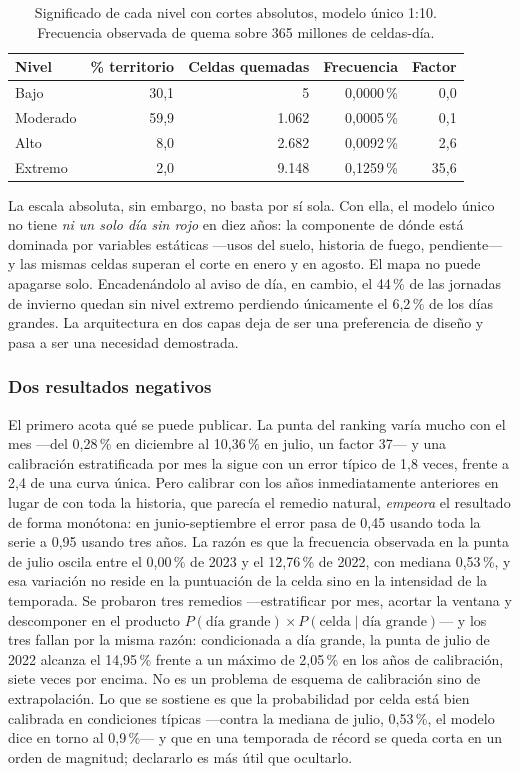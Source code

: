 \documentclass[10pt,a4paper]{article}
\begin{document}
\begin{table}[htbp]\centering\footnotesize
\caption{Significado de cada nivel con cortes absolutos, modelo único 1:10.
Frecuencia observada de quema sobre 365 millones de celdas-día.}
\label{tab:bandas}
\begin{tabular}{lrrrr}
\toprule
Nivel & \% territorio & Celdas quemadas & Frecuencia & Factor \\
\midrule
Bajo     & 30,1 & 5      & 0,0000\,\% & 0,0 \\
Moderado & 59,9 & 1.062  & 0,0005\,\% & 0,1 \\
Alto     & 8,0  & 2.682  & 0,0092\,\% & 2,6 \\
Extremo  & 2,0  & 9.148  & 0,1259\,\% & 35,6 \\
\bottomrule
\end{tabular}
\end{table}

La escala absoluta, sin embargo, no basta por sí sola. Con ella, el modelo único
no tiene \emph{ni un solo día sin rojo} en diez años: la componente de dónde está
dominada por variables estáticas ---usos del suelo, historia de fuego,
pendiente--- y las mismas celdas superan el corte en enero y en agosto. El mapa
no puede apagarse solo. Encadenándolo al aviso de día, en cambio, el 44\,\% de
las jornadas de invierno quedan sin nivel extremo perdiendo únicamente el
6,2\,\% de los días grandes. La arquitectura en dos capas deja de ser una
preferencia de diseño y pasa a ser una necesidad demostrada.

\subsubsection*{Dos resultados negativos}

El primero acota qué se puede publicar. La punta del ranking varía mucho con el
mes ---del 0,28\,\% en diciembre al 10,36\,\% en julio, un factor 37--- y una
calibración estratificada por mes la sigue con un error típico de 1,8 veces,
frente a 2,4 de una curva única. Pero calibrar con los años inmediatamente
anteriores en lugar de con toda la historia, que parecía el remedio natural,
\emph{empeora} el resultado de forma monótona: en junio-septiembre el error pasa
de 0,45 usando toda la serie a 0,95 usando tres años. La razón es que la
frecuencia observada en la punta de julio oscila entre el 0,00\,\% de 2023 y el
12,76\,\% de 2022, con mediana 0,53\,\%, y esa variación no reside en la
puntuación de la celda sino en la intensidad de la temporada. Se probaron tres remedios ---estratificar por
mes, acortar la ventana y descomponer en el producto
$P(\text{día grande})\times P(\text{celda}\mid\text{día grande})$--- y los tres
fallan por la misma razón: condicionada a día grande, la punta de julio de 2022
alcanza el 14,95\,\% frente a un máximo de 2,05\,\% en los años de calibración,
siete veces por encima. No es un problema de esquema de calibración sino de
extrapolación. Lo que se sostiene es que la probabilidad por celda está bien
calibrada en condiciones típicas ---contra la mediana de julio, 0,53\,\%, el
modelo dice en torno al 0,9\,\%--- y que en una temporada de récord se queda
corta en un orden de magnitud; declararlo es más útil que ocultarlo.
\end{document}
